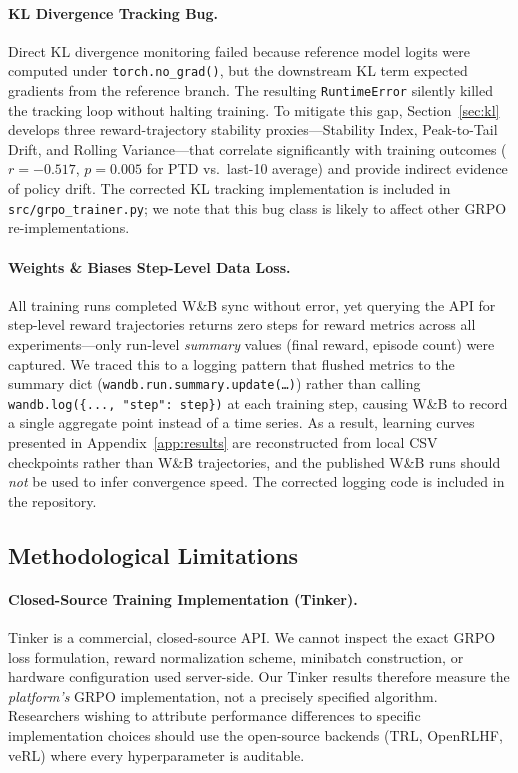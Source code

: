 \documentclass{article}
\begin{document}
\paragraph{KL Divergence Tracking Bug.}
Direct KL divergence monitoring failed because reference model logits were
computed under \texttt{torch.no\_grad()}, but the downstream KL term expected
gradients from the reference branch. The resulting \texttt{RuntimeError}
silently killed the tracking loop without halting training.
To mitigate this gap, Section~\ref{sec:kl} develops three reward-trajectory
stability proxies---Stability Index, Peak-to-Tail Drift, and Rolling
Variance---that correlate significantly with training outcomes
($r = -0.517$, $p = 0.005$ for PTD vs.\ last-10 average) and provide
indirect evidence of policy drift. The corrected KL tracking implementation
is included in \texttt{src/grpo\_trainer.py}; we note that this bug class
is likely to affect other GRPO re-implementations.

\paragraph{Weights \& Biases Step-Level Data Loss.}
All training runs completed W\&B sync without error, yet querying the API
for step-level reward trajectories returns zero steps for reward metrics across
all experiments---only run-level \emph{summary} values (final reward, episode
count) were captured. We traced this to a logging pattern that flushed metrics
to the summary dict (\texttt{wandb.run.summary.update(\ldots)}) rather than
calling \texttt{wandb.log(\{..., "step": step\})} at each training step,
causing W\&B to record a single aggregate point instead of a time series.
As a result, learning curves presented in Appendix~\ref{app:results} are
reconstructed from local CSV checkpoints rather than W\&B trajectories, and
the published W\&B runs should \emph{not} be used to infer convergence speed.
The corrected logging code is included in the repository.

\subsection{Methodological Limitations}
\label{sec:method_limits}

\paragraph{Closed-Source Training Implementation (Tinker).}
Tinker is a commercial, closed-source API. We cannot inspect the exact GRPO
loss formulation, reward normalization scheme, minibatch construction, or
hardware configuration used server-side. Our Tinker results therefore measure
the \emph{platform's} GRPO implementation, not a precisely specified algorithm.
Researchers wishing to attribute performance differences to specific
implementation choices should use the open-source backends (TRL, OpenRLHF,
veRL) where every hyperparameter is auditable.
\end{document}
